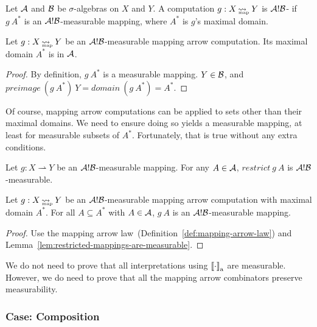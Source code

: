 \documentclass[preprint]{sigplanconf}
\newcommand{\arrow}{\rightsquigarrow}
\newcommand{\pto}{\rightharpoonup}
\newcommand{\gen}{_\mathrm{a}}
\newcommand{\map}{_\mathrm{map}}
\DeclareMathOperator{\mapto}{\arrow_{\mspace{-21mu}\map}}
\begin{document}
\begin{definition}
Let $\mathcal{A}$ and $\mathcal{B}$ be $\sigma$-algebras on $X$ and $Y$.
A computation $g : X \mapto Y$ is $\mathcal{A}!\mathcal{B}$- if $g~A^*$ is an $\mathcal{A}!\mathcal{B}$-measurable mapping, where $A^*$ is $g$'s maximal domain.
\label{def:measurable-mapping-arrow-computation}
\end{definition}

\begin{theorem}
Let $g : X \mapto Y$ be an $\mathcal{A}!\mathcal{B}$-measurable mapping arrow computation.
Its maximal domain $A^*$ is in $\mathcal{A}$.
\end{theorem}
\begin{proof}
By definition, $g~A^*$ is a measurable mapping. $Y \in \mathcal{B}$, and $preimage~(g~A^*)~Y = domain~(g~A^*) = A^*$.
\end{proof}

Of course, mapping arrow computations can be applied to sets other than their maximal domains.
We need to ensure doing so yields a measurable mapping, at least for measurable subsets of $A^*$.
Fortunately, that is true without any extra conditions.

\begin{lemma}
Let $g : X \pto Y$ be an $\mathcal{A}!\mathcal{B}$-measurable mapping.
For any $A \in \mathcal{A}$, $restrict~g~A$ is $\mathcal{A}!\mathcal{B}$-measurable.
\label{lem:restricted-mappings-are-measurable}
\end{lemma}

\begin{theorem}
Let $g : X \mapto Y$ be an $\mathcal{A}!\mathcal{B}$-measurable mapping arrow computation with maximal domain $A^*$.
For all $A \subseteq A^*$ with $A \in \mathcal{A}$, $g~A$ is an $\mathcal{A}!\mathcal{B}$-measurable mapping.
\label{thm:restricted-computations-are-measurable}
\end{theorem}
\begin{proof}
Use the mapping arrow law~(Definition~\ref{def:mapping-arrow-law}) and Lemma~\ref{lem:restricted-mappings-are-measurable}.
\end{proof}

We do not need to prove that all interpretations using $\meaningof{\cdot}\gen$ are measurable.
However, we do need to prove that all the mapping arrow combinators preserve measurability.

\subsubsection{Case: Composition}
\end{document}
